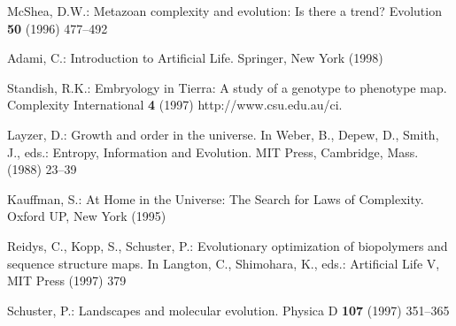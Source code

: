 %
%

\begin{thebibliography}{1}

McShea, D.W.:
\newblock Metazoan complexity and evolution: Is there a trend?
\newblock Evolution \textbf{50} (1996) 477--492

Adami, C.:
\newblock Introduction to Artificial Life.
\newblock Springer, New York (1998)

Standish, R.K.:
\newblock Embryology in {T}ierra: A study of a genotype to phenotype map.
\newblock Complexity International \textbf{4} (1997) http://www.csu.edu.au/ci.

Layzer, D.:
\newblock Growth and order in the universe.
\newblock In Weber, B., Depew, D., Smith, J., eds.: Entropy, Information and
  Evolution.
\newblock MIT Press, Cambridge, Mass. (1988)  23--39

Kauffman, S.:
\newblock At Home in the Universe: The Search for Laws of Complexity.
\newblock Oxford UP, New York (1995)

Reidys, C., Kopp, S., Schuster, P.:
\newblock Evolutionary optimization of biopolymers and sequence structure maps.
\newblock In Langton, C., Shimohara, K., eds.: Artificial Life V, MIT Press
  (1997) 379

Schuster, P.:
\newblock Landscapes and molecular evolution.
\newblock Physica D \textbf{107} (1997) 351--365

\end{thebibliography}



